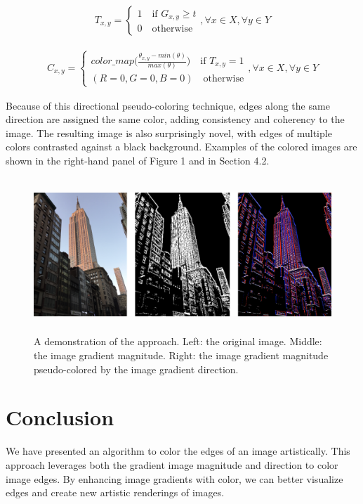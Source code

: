 \documentclass{article}
\begin{document}
\begin{align}
T_{x,y} = \left\{
  \begin{array}{lr}
    1 \quad \text{if  } G_{x,y} \geq t \\
    0 \quad \text{otherwise}
  \end{array}
\right.
, \forall x \in X, \forall y \in Y
\end{align}

\begin{align}
C_{x,y} = \left\{
  \begin{array}{lr}
    color\_map \Big(\frac{\theta_{x,y} - min(\theta)}{max(\theta)} \Big) \quad \text{if  } T_{x,y} = 1 \\
    (R=0, G=0, B=0) \quad \text{otherwise}
  \end{array}
\right.
, \forall x \in X, \forall y \in Y
\end{align}

Because of this directional pseudo-coloring technique, edges along the same direction are assigned the same color, adding consistency and coherency to the image. The resulting image is also surprisingly novel, with edges of multiple colors contrasted against a black background. Examples of the colored images are shown in the right-hand panel of Figure 1 and in Section 4.2.

\begin{figure}[h!]
\centering
\includegraphics[height=5.8cm]{images/example_edge_coloring.png}
\caption{A demonstration of the approach. Left: the original image. Middle: the image gradient magnitude. Right: the image gradient magnitude pseudo-colored by the image gradient direction.}
\label{fig:example}
\end{figure}

\section{Conclusion}

We have presented an algorithm to color the edges of an image artistically. This approach leverages both the gradient image magnitude and direction to color image edges. By enhancing image gradients with color, we can better visualize edges and create new artistic renderings of images.
\end{document}
